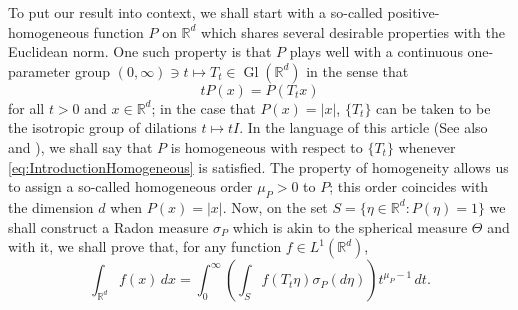 \documentclass[11pt]{article}
\newtheorem{theorem}{Theorem}[section]
\newcommand\Gl{\operatorname{Gl}} %
\begin{document}
To put our result into context, we shall start with a so-called positive-homogeneous function $P$ on $\mathbb{R}^d$ which shares several desirable properties with the Euclidean norm. One such property is that $P$ plays well with a continuous one-parameter group $(0,\infty)\ni t\mapsto T_t\in\Gl(\mathbb{R}^d)$ in the sense that
\begin{equation}\label{eq:IntroductionHomogeneous}
    tP(x)=P(T_t x)
\end{equation}
for all $t>0$ and $x\in\mathbb{R}^d$; in the case that $P(x)=|x|$, $\{T_t\}$ can be taken to be the isotropic group of dilations $t\mapsto t I$. In the language of this article (See also \cite{Randles2017} and \cite{Randles2017a}), we shall say that $P$ is homogeneous with respect to $\{T_t\}$ whenever \eqref{eq:IntroductionHomogeneous} is satisfied. The property of homogeneity allows us to assign a so-called homogeneous order $\mu_P>0$ to $P$; this order coincides with the dimension $d$ when $P(x)=|x|$. Now, on the set $S=\{\eta\in\mathbb{R}^d:P(\eta)=1\}$ we shall construct a Radon measure $\sigma_P$ which is akin to the spherical measure $\Theta$ and with it, we shall prove that, for any function $f\in L^1(\mathbb{R}^d)$, 
\begin{equation*}
    \int_{\mathbb{R}^d}f(x)\,dx =\int_0^\infty \left(\int_S f(T_t\eta)\sigma_P(d\eta)\right)t^{\mu_P-1}\,dt.
\end{equation*}

\end{document}
